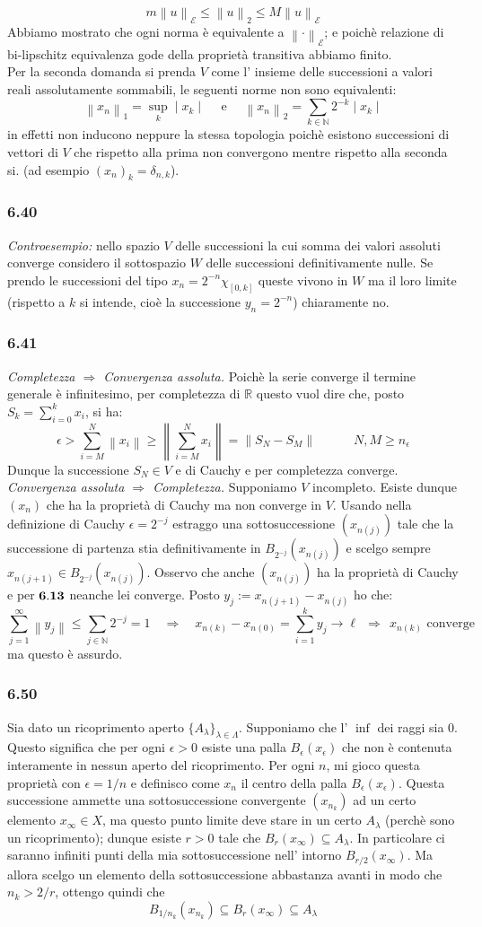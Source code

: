 \documentclass[a4paper,11pt]{article}
\newcommand{\ex}[1]{\subsubsection*{#1}}
\newcommand{\NN}{\mathbb{N}}
\newcommand{\RR}{\mathbb{R}}
\newcommand{\Norm}[1]{\left \| #1 \right\|}
\newcommand{\rec}[1]{{\bf #1}}
\newcommand{\norm}[1]{\mid{#1}\mid}
\begin{document}
$$m\Norm{u}_{\mathcal{E}}\leq \Norm{u}_2\leq M\Norm{u}_{\mathcal{E}}$$
Abbiamo mostrato che ogni norma è equivalente a $\Norm{\cdot}_{\mathcal{E}}$; e poichè relazione di bi-lipschitz equivalenza gode della proprietà transitiva abbiamo finito.\\ 
Per la seconda domanda si prenda $V$ come l' insieme delle successioni a valori reali assolutamente sommabili, le seguenti norme non sono equivalenti:
$$
\Norm{x_n}_1=\sup_k \norm{x_k} \quad \mbox{      e       }\quad \Norm{x_n}_2=\sum_{k\in\NN} 2^{-k}\norm{x_k}
$$
in effetti non inducono neppure la stessa topologia poichè esistono successioni di vettori di $V$ che rispetto alla prima non convergono mentre rispetto alla seconda si. (ad esempio $(x_n)_k=\delta_{n,k}$).
\ex{6.40} {\it Controesempio:} nello spazio $V$ delle successioni la cui somma dei valori assoluti converge considero il sottospazio $W$ delle successioni definitivamente nulle. Se prendo le successioni del tipo $x_n=2^{-n}\chi_{[0,k]}$ queste vivono in $W$ ma il loro limite (rispetto a $k$ si intende, cioè la successione $y_n=2^{-n}$) chiaramente no. 
\ex{6.41} {\it Completezza $\Rightarrow$ Convergenza assoluta.} Poichè la serie converge il termine generale è infinitesimo, per completezza di $\RR$ questo vuol dire che, posto $S_k=\sum_{i=0}^k x_i$, si ha:
$$
\epsilon>\sum_{i=M}^{N}\Norm{x_i}\geq \Norm{\sum_{i=M}^{N}x_i}=\Norm{S_N-S_M}\qquad\quad N,M \geq n_{\epsilon}
$$
Dunque la successione $S_N\in V$ e di Cauchy e per completezza converge.\\ 
{\it Convergenza assoluta $\Rightarrow$ Completezza.} Supponiamo $V$ incompleto. Esiste dunque $(x_n)$ che ha la proprietà di Cauchy ma non converge in $V$. Usando nella definizione di Cauchy $\epsilon=2^{-j}$ estraggo una sottosuccessione $(x_{n(j)})$ tale che la successione di partenza stia definitivamente in $B_{2^{-j}}(x_{n(j)})$ e scelgo sempre $x_{n(j+1)}\in B_{2^{-j}}(x_{n(j)})$. Osservo che anche $(x_{n(j)})$ ha la proprietà di Cauchy e per $\rec{6.13}$ neanche lei converge. Posto $y_j:=x_{n(j+1)}-x_{n(j)}$ ho che:
$$
\sum_{j=1}^{\infty}\Norm{y_j}\leq \sum_{j\in\NN}2^{-j}=1\quad \Rightarrow\quad x_{n(k)}-x_{n(0)}=\sum_{i=1}^{k}y_j\rightarrow \ell\ \  \Rightarrow\ \  x_{n(k)}\mbox{ converge}
$$ 
ma questo è assurdo.
\ex{6.50} Sia dato un ricoprimento aperto $\{A_{\lambda}\}_{\lambda\in\Lambda}$. Supponiamo che l' $\inf$ dei raggi sia $0$. Questo significa che per ogni $\epsilon>0$ esiste una palla $B_{\epsilon}(x_{\epsilon})$ che non è contenuta interamente in nessun aperto del ricoprimento. Per ogni $n$, mi gioco questa proprietà con $\epsilon=1/n$ e definisco come $x_n$ il centro della palla $B_{\epsilon}(x_\epsilon)$. Questa successione ammette una sottosuccessione convergente $(x_{n_k})$ ad un certo elemento $x_{\infty}\in X$, ma questo punto limite deve stare in un certo $A_{\lambda}$ (perchè sono un ricoprimento); dunque esiste $r>0$ tale che $B_r(x_{\infty})\subseteq A_{\lambda}$. In particolare ci saranno infiniti punti della mia sottosuccessione nell' intorno $B_{r/2}(x_{\infty})$. Ma allora scelgo un elemento della sottosuccessione abbastanza avanti in modo che $n_k>2/r$, ottengo quindi che $$B_{1/{n_k}}(x_{n_k})\subseteq B_r(x_{\infty})\subseteq A_{\lambda}$$
\end{document}
